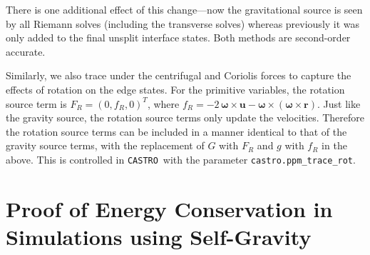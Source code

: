 \documentclass[iop]{../emulateapj}
\newcommand{\castro}{\texttt{CASTRO}}
\begin{document}
There is one additional effect of this change---now the gravitational
source is seen by all Riemann solves (including the transverse solves)
whereas previously it was only added to the final unsplit interface
states.  Both methods are second-order accurate.

Similarly, we also trace under the centrifugal and Coriolis forces to capture
the effects of rotation on the edge states. For the primitive variables, the rotation
source term is $F_R = (0, f_R, 0)^T$, where $f_R = -2\, {\bm{\omega}} \times \mathbf{u} - {\bm\omega}\times \left({\bm\omega} \times \mathbf{r}\right).$
Just like the gravity source, the rotation source terms only update the velocities. Therefore 
the rotation source terms can be included in a manner identical to that of the gravity source
terms, with the replacement of $G$ with $F_R$ and $g$ with $f_R$ in the above. This is controlled in \castro\
with the parameter {\tt castro.ppm\_trace\_rot}.



\section{Proof of Energy Conservation in Simulations using Self-Gravity}
\label{app:gravity}
\end{document}

